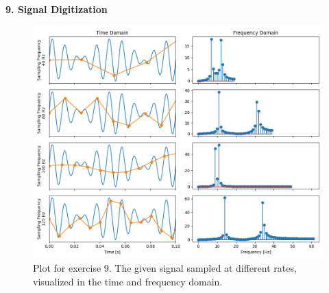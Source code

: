\newpage
\textbf{\large 9. Signal Digitization}
\\



\begin{figure}[H]
	\centering
	\includegraphics[width=16cm]{img/ex_9.png}
	\captionsetup{width=14cm}
	\caption{Plot for exercise 9. The given signal sampled at different rates, visualized in the time and frequency domain.}
\end{figure}
